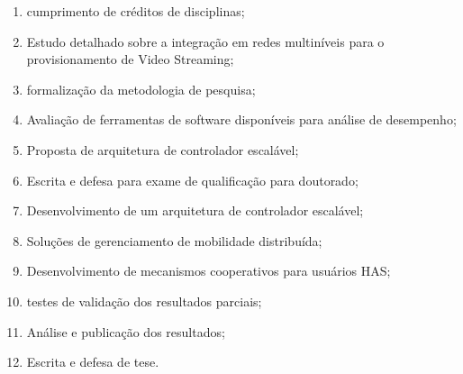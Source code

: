 
\begin{enumerate}
	\item cumprimento de créditos de disciplinas;

    \item Estudo detalhado sobre a integração em redes multiníveis para o provisionamento de Video Streaming;
    \item formalização da metodologia de pesquisa;
    \item Avaliação de ferramentas de software disponíveis para análise de desempenho;
    \item Proposta de arquitetura de controlador escalável;
    \item Escrita e defesa para exame de qualificação para doutorado;
    \item Desenvolvimento de um arquitetura de controlador escalável;
    \item Soluções de gerenciamento de mobilidade distribuída;
    \item Desenvolvimento de mecanismos cooperativos para usuários HAS;
    \item testes de validação dos resultados parciais;
    \item Análise e publicação dos resultados;
    \item Escrita e defesa de tese.

\end{enumerate}

